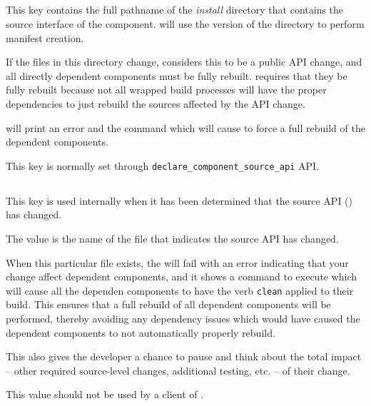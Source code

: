 \subsection{}\label{lmsbwcomponent:souce-api}

This key contains the full pathname of the \emph{install} directory
that contains the source interface of the component.  \lmsbw will use
the \destdir version of the directory to perform \mtree manifest
creation.

If the files in this directory change, \lmsbw considers this to be a
public API change, and all directly dependent components must be fully
rebuilt.  \lmsbw requires that they be fully rebuilt because not all
wrapped build processes will have the proper dependencies to just
rebuild the sources affected by the API change.

\lmsbw will print an error and the command which will cause \lmsbw to
force a full rebuild of the dependent components.

This key is normally set through
\texttt{declare\_component\_source\_api} API.


\subsection{}

This key is used internally when it has been determined that the
source API () has changed.

The value is the name of the file that indicates the source API has
changed.

When this particular file exists, the \lmsbw will fail with an error
indicating that your change affect dependent components, and it shows
a command to execute which will cause all the dependen components to
have the verb \texttt{clean} applied to their build.  This ensures
that a full rebuild of all dependent components will be performed,
thereby avoiding any dependency issues which would have caused the
dependent components to not automatically properly rebuild.

This also gives the developer a chance to pause and think about the
total impact -- other required source-level changes, additional
testing, etc. -- of their change.

This value should not be used by a client of \lmsbw.

\subsection{}

